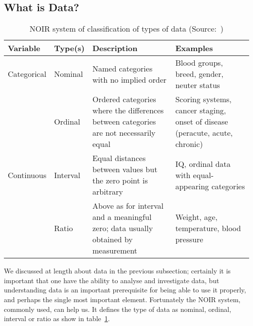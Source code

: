 \subsection{What is Data?}
\begin{table}[ht]
    \begin{tabularx}{\textwidth}{ 
    | >{\raggedright\arraybackslash} m{1.8cm} 
    | >{\raggedright\arraybackslash} m{1.8cm}
    | >{\raggedright\arraybackslash} X 
    | >{\raggedright\arraybackslash} X | }
    \toprule
    \hfil\bfseries Variable & \hfil\bfseries Type(s) & \hfil\bfseries Description & \hfil\bfseries Examples \\ 
    \midrule
    Categorical & Nominal & Named categories with no implied order & Blood groups, breed, gender, neuter status \\
    ~ & Ordinal & Ordered categories where the differences between categories are not necessarily equal & Scoring systems, cancer staging, onset of disease (peracute, acute, chronic) \\ 
    \midrule
    Continuous & Interval & Equal distances between values but the zero point is arbitrary & IQ, ordinal data with equal-appearing categories\\
    ~ & Ratio & Above as for interval and a meaningful zero; data usually obtained by measurement & Weight, age, temperature, blood pressure \\
    \bottomrule
    \end{tabularx}
\caption{NOIR system of classification of types of data (Source:~\cite{Article:intro_to_data_analysis})}
\label{table:noir_sys}     
\end{table}
We discussed at length about data in the previous subsection; certainly it is important that one have the ability to analyse and investigate data, but 
understanding data is an important prerequisite for being able to use it properly, and perhaps the single most important element.
Fortunately the NOIR system, commonly used, can help us. It defines the type of data as nominal, ordinal, interval or ratio as show in table~\ref{table:noir_sys}.

